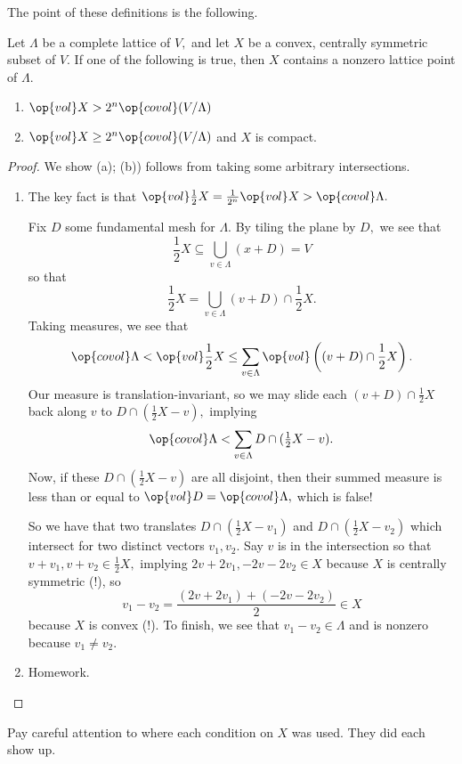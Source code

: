 \documentclass[../notes.tex]{subfiles}
\begin{document}
The point of these definitions is the following.
\begin{theorem}[Minkowski]
    Let $\Lambda$ be a complete lattice of $V,$ and let $X$ be a convex, centrally symmetric subset of $V.$ If one of the following is true, then $X$ contains a nonzero lattice point of $\Lambda.$
    \begin{enumerate}[label=(\alph*)]
        \item $\op{vol}X>2^n\op{covol}(V/\Lambda)$
        \item $\op{vol}X\ge2^n\op{covol}(V/\Lambda)$ and $X$ is compact.
    \end{enumerate}
\end{theorem}
\begin{proof}
    We show (a); (b)) follows from taking some arbitrary intersections.
    \begin{enumerate}[label=(\alph*)]
        \item The key fact is that $\op{vol}\frac12X=\frac1{2^n}\op{vol}X>\op{covol}\Lambda.$

        Fix $D$ some fundamental mesh for $\Lambda.$ By tiling the plane by $D,$ we see that
        \[\frac12X\subseteq\bigcup_{v\in\Lambda}(x+D)=V\]
        so that
        \[\frac12X=\bigcup_{v\in\Lambda}(v+D)\cap\frac12X.\]
        Taking measures, we see that
        \[\op{covol}\Lambda<\op{vol}\frac12X\le\sum_{v\in\Lambda}\op{vol}\left((v+D)\cap\frac12X\right).\]
        Our measure is translation-invariant, so we may slide each $(v+D)\cap\tfrac12X$ back along $v$ to $D\cap(\tfrac12X-v),$ implying
        \[\op{covol}\Lambda<\sum_{v\in\Lambda}D\cap(\tfrac12X-v).\]
        Now, if these $D\cap(\tfrac12X-v)$ are all disjoint, then their summed measure is less than or equal to $\op{vol}D=\op{covol}\Lambda,$ which is false!

        So we have that two translates $D\cap(\tfrac12X-v_1)$ and $D\cap(\tfrac12X-v_2)$ which intersect for two distinct vectors $v_1,v_2.$ Say $v$ is in the intersection so that $v+v_1,v+v_2\in\tfrac12X,$ implying $2v+2v_1,-2v-2v_2\in X$ because $X$ is centrally symmetric (!), so
        \[v_1-v_2=\frac{(2v+2v_1)+(-2v-2v_2)}2\in X\]
        because $X$ is convex (!). To finish, we see that $v_1-v_2\in\Lambda$ and is nonzero because $v_1\ne v_2.$
        \item Homework.
        \qedhere
    \end{enumerate}
\end{proof}
\begin{remark}
    Pay careful attention to where each condition on $X$ was used. They did each show up.
\end{remark}
\end{document}

